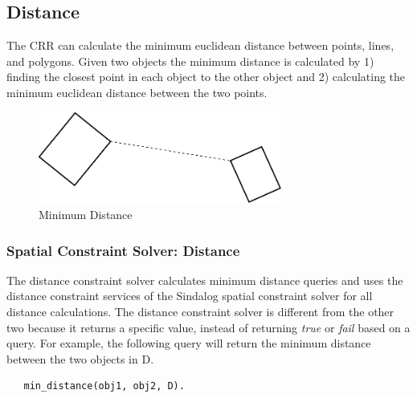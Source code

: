 \documentclass[12pt]{ucthesis}
\begin{document}



\subsection{Distance}
The CRR can calculate the minimum euclidean distance between points, lines, and polygons. Given two objects the minimum distance is calculated by 1) finding the closest point in each object to the other object and 2) calculating the minimum euclidean distance between the two points. 

\begin{figure}[H]
\centering
\includegraphics[width=80mm]{min-dist}
\caption{Minimum Distance}
\label{min-dist}
\end{figure}

\subsubsection{Spatial Constraint Solver: Distance}
The distance constraint solver calculates minimum distance queries and uses the distance constraint services of the Sindalog \cite{sindalog} spatial constraint solver for all distance calculations. The distance constraint solver is different from the other two because it returns a specific value, instead of returning \emph{true} or \emph{fail} based on a query. For example, the following query will return the minimum distance between the two objects in D.
\begin{verbatim}
   min_distance(obj1, obj2, D). 
\end{verbatim}
\end{document}
